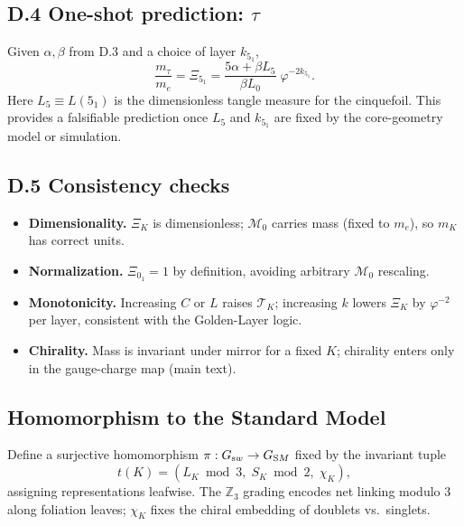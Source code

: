 \documentclass[11pt, preprint,titlepage]{revtex4-2}
\begin{document}
		\subsection*{D.4 One-shot prediction: \texorpdfstring{\(\tau\)}{tau}}
		Given \(\alpha,\beta\) from D.3 and a choice of layer \(k_{5_1}\),
		\[
		\frac{m_\tau}{m_e}
		= \Xi_{5_1}
		= \frac{5\alpha+\beta L_5}{\beta L_0}\;\varphi^{-2k_{5_1}}.
		\]
		Here \(L_5\equiv L(5_1)\) is the dimensionless tangle measure for the cinquefoil.
		This provides a falsifiable prediction once \(L_5\) and \(k_{5_1}\) are fixed by the core-geometry model or simulation.

		\subsection*{D.5 Consistency checks}
		\begin{itemize}
		\item \textbf{Dimensionality.} \(\Xi_K\) is dimensionless; \(\mathcal{M}_0\) carries mass (fixed to \(m_e\)), so \(m_K\) has correct units.
		\item \textbf{Normalization.} \(\Xi_{0_1}=1\) by definition, avoiding arbitrary \(\mathcal{M}_0\) rescaling.
		\item \textbf{Monotonicity.} Increasing \(C\) or \(L\) raises \(\mathcal{T}_K\); increasing \(k\) lowers \(\Xi_K\) by \(\varphi^{-2}\) per layer, consistent with the Golden-Layer logic.
		\item \textbf{Chirality.} Mass is invariant under mirror for a fixed \(K\); chirality enters only in the gauge-charge map (main text).
		\end{itemize}

		\subsection{Homomorphism to the Standard Model}
		Define a surjective homomorphism \(\pi:G_{\textrm sw}\to G_{\textrm SM}\) fixed by the invariant tuple
		\begin{equation}
		t(K)=(L_K\bmod 3,\; S_K\bmod 2,\; \chi_K),
		\end{equation}
		assigning representations leafwise. The \(\mathbb Z_3\) grading encodes net linking modulo 3 along foliation leaves; \(\chi_K\) fixes the chiral embedding of doublets vs.\ singlets.

\end{document}
